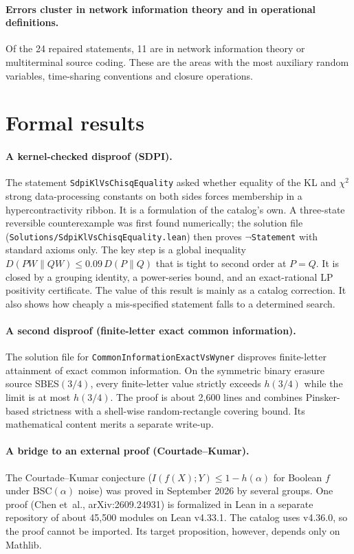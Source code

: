 \documentclass[11pt]{article}
\newcommand{\code}[1]{\texttt{#1}}
\begin{document}
\paragraph{Errors cluster in network information theory and in operational definitions.} Of the
24 repaired statements, 11 are in network information theory or multiterminal source coding.
These are the areas with the most auxiliary random variables, time-sharing conventions and
closure operations.

\section{Formal results}\label{sec:results}

\paragraph{A kernel-checked disproof (SDPI).}
The statement \code{SdpiKlVsChisqEquality} asked whether equality of the KL and $\chi^2$
strong data-processing constants on both sides forces membership in a hypercontractivity ribbon.
It is a formulation of the catalog's own. A three-state reversible counterexample was first found
numerically; the solution file (\code{Solutions/SdpiKlVsChisqEquality.lean}) then proves
$\neg$\code{Statement} with standard axioms only. The key step is a global inequality
$D(PW\|QW)\le 0.09\,D(P\|Q)$ that is tight to second order at $P=Q$. It is closed by a grouping
identity, a power-series bound, and an exact-rational LP positivity certificate. The value of
this result is mainly as a catalog correction. It also shows how cheaply a mis-specified
statement falls to a determined search.

\paragraph{A second disproof (finite-letter exact common information).}
The solution file for \code{CommonInformation\-ExactVsWyner} disproves finite-letter attainment
of exact common information. On the symmetric binary erasure source SBES$(3/4)$, every finite-letter
value strictly exceeds $h(3/4)$ while the limit is at most $h(3/4)$. The proof is about 2{,}600
lines and combines Pinsker-based strictness with a shell-wise random-rectangle covering bound. Its
mathematical content merits a separate write-up.

\paragraph{A bridge to an external proof (Courtade--Kumar).}
The Courtade--Kumar conjecture ($I(f(X);Y)\le1-h(\alpha)$ for Boolean $f$ under BSC$(\alpha)$
noise) was proved in September 2026 by several groups. One proof (Chen et~al., arXiv:2609.24931)
is formalized in Lean in a separate repository of about 45{,}500 modules on Lean v4.33.1. The
catalog uses v4.36.0, so the proof cannot be imported. Its target proposition, however, depends
only on Mathlib.
\end{document}
